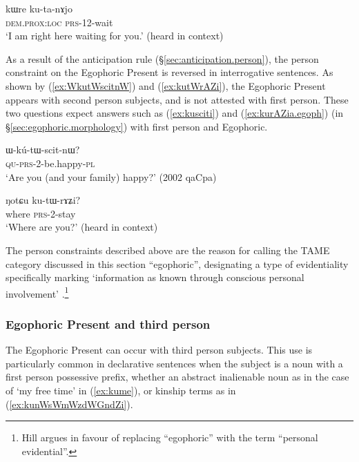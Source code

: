 \begin{exe}
	\ex \label{ex:kutanAjo}
	\gll kɯre ku-ta-nɤjo \\
	\textsc{dem}.\textsc{prox}:\textsc{loc} \textsc{prs}-1\fl{}2-wait \\
	\glt `I am right here waiting for you.' (heard in context)
\end{exe}

As a result of the anticipation rule 
(§\ref{sec:anticipation.person}), the person constraint on the Egophoric Present is reversed in interrogative sentences. As shown by (\ref{ex:WkutWscitnW}) and (\ref{ex:kutWrAZi}), the Egophoric Present appears with second person subjects, and is not attested with first person. These two questions expect answers such as (\ref{ex:kusciti}) and (\ref{ex:kurAZia.egoph}) (in §\ref{sec:egophoric.morphology}) with first person and Egophoric.

\begin{exe}
	\ex \label{ex:WkutWscitnW}
	\gll ɯ-kú-tɯ-scit-nɯ? \\
	\textsc{qu}-\textsc{prs}-2-be.happy-\textsc{pl} \\
	\glt `Are you (and your family) happy?' (2002 qaCpa)
\end{exe}

\begin{exe}
	\ex \label{ex:kutWrAZi}
	\gll ŋotɕu ku-tɯ-rɤʑi? \\
	where \textsc{prs}-2-stay \\
	\glt `Where are you?' (heard in context)
\end{exe}

The person constraints described above are the reason for calling the TAME category discussed in this section ``egophoric'', designating a type of evidentiality specifically marking `information as known through conscious personal involvement' \citep{hill20egophoricity}.\footnote{Hill argues in favour of replacing ``egophoric'' with the term ``personal evidential''. } 
 
\subsubsection{Egophoric Present and third person} 
The Egophoric Present can occur with third person subjects. This use is particularly common in declarative sentences when the subject is a noun with a first person possessive prefix, whether an abstract inalienable noun as in the case of  `my free time' in (\ref{ex:kume}), or kinship terms as in (\ref{ex:kunWsWmWzdWGndZi}).

